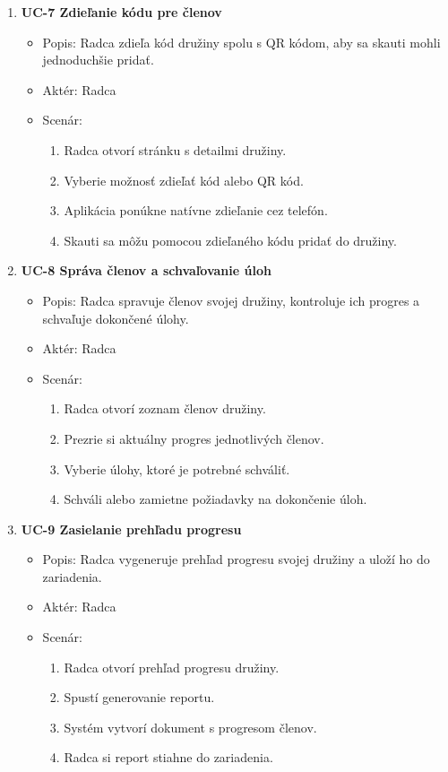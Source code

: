 \begin{enumerate}
    \item \textbf{UC-7 Zdieľanie kódu pre členov}
    \begin{itemize}
        \item Popis: Radca zdieľa kód družiny spolu s QR kódom, aby sa skauti mohli jednoduchšie pridať.
        \item Aktér: Radca
        \item Scenár:
        \begin{enumerate}
            \item Radca otvorí stránku s detailmi družiny.
            \item Vyberie možnosť zdieľať kód alebo QR kód.
            \item Aplikácia ponúkne natívne zdieľanie cez telefón.
            \item Skauti sa môžu pomocou zdieľaného kódu pridať do družiny.
        \end{enumerate}
    \end{itemize}

    \item \textbf{UC-8 Správa členov a schvaľovanie úloh}
    \begin{itemize}
        \item Popis: Radca spravuje členov svojej družiny, kontroluje ich progres a schvaľuje dokončené úlohy.
        \item Aktér: Radca
        \item Scenár:
        \begin{enumerate}
            \item Radca otvorí zoznam členov družiny.
            \item Prezrie si aktuálny progres jednotlivých členov.
            \item Vyberie úlohy, ktoré je potrebné schváliť.
            \item Schváli alebo zamietne požiadavky na dokončenie úloh.
        \end{enumerate}
    \end{itemize}

    \item \textbf{UC-9 Zasielanie prehľadu progresu}
    \begin{itemize}
        \item Popis: Radca vygeneruje prehľad progresu svojej družiny a uloží ho do zariadenia.
        \item Aktér: Radca
        \item Scenár:
        \begin{enumerate}
            \item Radca otvorí prehľad progresu družiny.
            \item Spustí generovanie reportu.
            \item Systém vytvorí dokument s progresom členov.
            \item Radca si report stiahne do zariadenia.
        \end{enumerate}
    \end{itemize}


\end{enumerate}
